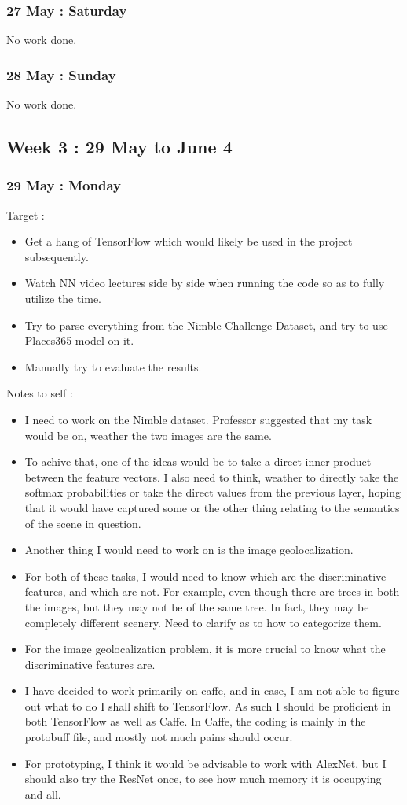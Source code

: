 \documentclass{article}
\begin{document}
\subsubsection{27 May : Saturday}
No work done.
\subsubsection{28 May : Sunday}
No work done.

\subsection{Week 3 : 29 May to June 4}
\subsubsection{29 May : Monday}
Target :
\begin{itemize}
\item Get a hang of TensorFlow which would likely be used in the project subsequently.
\item Watch NN video lectures side by side when running the code so as to fully utilize the time.
\item Try to parse everything from the Nimble Challenge Dataset, and try to use Places365 model on it.
\item Manually try to evaluate the results.
\end{itemize}

Notes to self :
\begin{itemize}
\item I need to work on the Nimble dataset. Professor suggested that my task would be on, weather the two images are the same.
\item To achive that, one of the ideas would be to take a direct inner product between the feature vectors. I also need to think, weather to directly take the softmax probabilities or take the direct values from the previous layer, hoping that it would have captured some or the other thing relating to the semantics of the scene in question.
\item Another thing I would need to work on is the image geolocalization.
\item For both of these tasks, I would need to know which are the discriminative features, and which are not. For example, even though there are trees in both the images, but they may not be of the same tree. In fact, they may be completely different scenery. Need to clarify as to how to categorize them.
\item For the image geolocalization problem, it is more crucial to know what the discriminative features are.
\item I have decided to work primarily on caffe, and in case, I am not able to figure out what to do I shall shift to TensorFlow. As such I should be proficient in both TensorFlow as well as Caffe. In Caffe, the coding is mainly in the protobuff file, and mostly not much pains should occur.
\item For prototyping, I think it would be advisable to work with AlexNet, but I should also try the ResNet once, to see how much memory it is occupying and all.
\end{itemize}
\end{document}
